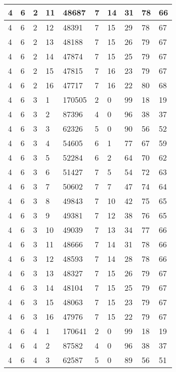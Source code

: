 \begin{table}[!ht]
\begin{tabular}{|l|l|l|l|l|l|l|l|l|l|}
        4 & 6 & 2 & 11 & 48687 & 7 & 14 & 31 & 78 & 66 \\ \hline
        4 & 6 & 2 & 12 & 48391 & 7 & 15 & 29 & 78 & 67 \\ \hline
        4 & 6 & 2 & 13 & 48188 & 7 & 15 & 26 & 79 & 67 \\ \hline
        4 & 6 & 2 & 14 & 47874 & 7 & 15 & 25 & 79 & 67 \\ \hline
        4 & 6 & 2 & 15 & 47815 & 7 & 16 & 23 & 79 & 67 \\ \hline
        4 & 6 & 2 & 16 & 47717 & 7 & 16 & 22 & 80 & 68 \\ \hline
        4 & 6 & 3 & 1 & 170505 & 2 & 0 & 99 & 18 & 19 \\ \hline
        4 & 6 & 3 & 2 & 87396 & 4 & 0 & 96 & 38 & 37 \\ \hline
        4 & 6 & 3 & 3 & 62326 & 5 & 0 & 90 & 56 & 52 \\ \hline
        4 & 6 & 3 & 4 & 54605 & 6 & 1 & 77 & 67 & 59 \\ \hline
        4 & 6 & 3 & 5 & 52284 & 6 & 2 & 64 & 70 & 62 \\ \hline
        4 & 6 & 3 & 6 & 51427 & 7 & 5 & 54 & 72 & 63 \\ \hline
        4 & 6 & 3 & 7 & 50602 & 7 & 7 & 47 & 74 & 64 \\ \hline
        4 & 6 & 3 & 8 & 49843 & 7 & 10 & 42 & 75 & 65 \\ \hline
        4 & 6 & 3 & 9 & 49381 & 7 & 12 & 38 & 76 & 65 \\ \hline
        4 & 6 & 3 & 10 & 49039 & 7 & 13 & 34 & 77 & 66 \\ \hline
        4 & 6 & 3 & 11 & 48666 & 7 & 14 & 31 & 78 & 66 \\ \hline
        4 & 6 & 3 & 12 & 48593 & 7 & 14 & 28 & 78 & 66 \\ \hline
        4 & 6 & 3 & 13 & 48327 & 7 & 15 & 26 & 79 & 67 \\ \hline
        4 & 6 & 3 & 14 & 48104 & 7 & 15 & 25 & 79 & 67 \\ \hline
        4 & 6 & 3 & 15 & 48063 & 7 & 15 & 23 & 79 & 67 \\ \hline
        4 & 6 & 3 & 16 & 47976 & 7 & 15 & 22 & 79 & 67 \\ \hline
        4 & 6 & 4 & 1 & 170641 & 2 & 0 & 99 & 18 & 19 \\ \hline
        4 & 6 & 4 & 2 & 87582 & 4 & 0 & 96 & 38 & 37 \\ \hline
        4 & 6 & 4 & 3 & 62587 & 5 & 0 & 89 & 56 & 51 \\ \hline

\end{tabular}
\end{table}
